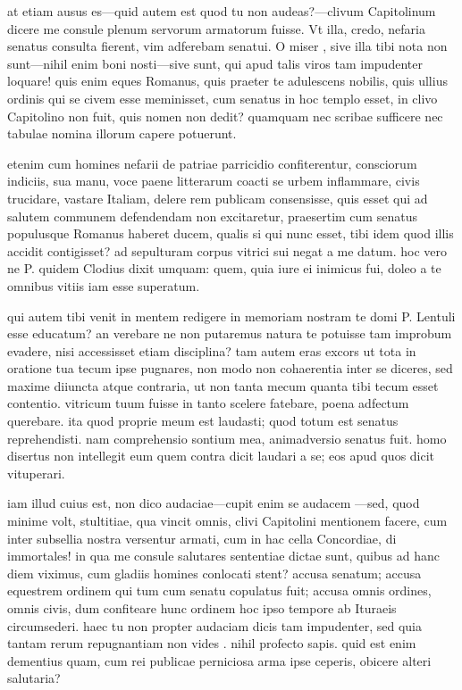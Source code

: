  at etiam ausus es—quid autem est quod tu non audeas?—clivum Capitolinum dicere me consule plenum servorum armatorum fuisse. Vt illa, credo, nefaria senatus consulta fierent, vim adferebam senatui. O miser , sive illa tibi nota non sunt—nihil enim boni nosti—sive sunt, qui apud talis viros tam impudenter loquare! quis enim eques Romanus, quis praeter te adulescens nobilis, quis ullius ordinis qui se civem esse meminisset, cum senatus in hoc templo esset, in clivo Capitolino non fuit, quis nomen non dedit? quamquam nec scribae sufficere nec tabulae nomina illorum capere potuerunt.

 etenim cum homines nefarii de patriae parricidio confiterentur, consciorum indiciis, sua manu, voce paene litterarum coacti se urbem inflammare, civis trucidare, vastare Italiam, delere rem publicam consensisse, quis esset qui ad salutem communem defendendam non excitaretur, praesertim cum senatus populusque Romanus haberet ducem, qualis si qui nunc esset, tibi idem quod illis accidit contigisset? ad sepulturam corpus vitrici sui negat a me datum. hoc vero ne P. quidem Clodius dixit umquam: quem, quia iure ei inimicus fui, doleo a te omnibus vitiis iam esse superatum.

 qui autem tibi venit in mentem redigere in memoriam nostram te domi P. Lentuli esse educatum? an verebare ne non putaremus natura te potuisse tam improbum evadere, nisi accessisset etiam disciplina? tam autem eras excors ut tota in oratione tua tecum ipse pugnares, non modo non cohaerentia inter se diceres, sed maxime diiuncta atque contraria, ut non tanta mecum quanta tibi tecum esset contentio. vitricum tuum fuisse in tanto scelere fatebare, poena adfectum querebare. ita quod proprie meum est laudasti; quod totum est senatus reprehendisti. nam comprehensio sontium mea, animadversio senatus fuit. homo disertus non intellegit eum quem contra dicit laudari a se; eos apud quos dicit vituperari.

 iam illud cuius est, non dico audaciae—cupit enim se audacem —sed, quod minime volt, stultitiae, qua vincit omnis, clivi Capitolini mentionem facere, cum inter subsellia nostra versentur armati, cum in hac cella Concordiae, di immortales! in qua me consule salutares sententiae dictae sunt, quibus ad hanc diem viximus, cum gladiis homines conlocati stent? accusa senatum; accusa equestrem ordinem qui tum cum senatu copulatus fuit; accusa omnis ordines, omnis civis, dum confiteare hunc ordinem hoc ipso tempore ab Ituraeis circumsederi. haec tu non propter audaciam dicis tam impudenter, sed quia tantam rerum repugnantiam non vides . nihil profecto sapis. quid est enim dementius quam, cum rei publicae perniciosa arma ipse ceperis, obicere alteri salutaria?

